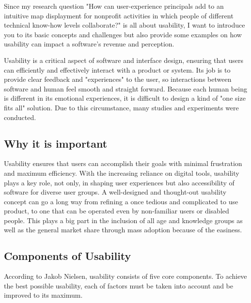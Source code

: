 \Author{\daAuthorTwo}

Since my research question "How can user-experience principals add to an intuitive map displayment for nonprofit activities in which people of different technical know-how levels collaborate?" is all about usability, I want to introduce you to its basic concepts and challenges but also provide some examples on how usability can impact a software's revenue and perception.

\blankLine

Usability is a critical aspect of software and interface design, ensuring that users can efficiently and effectively interact with a product or system. Its job is to provide clear feedback and "experiences" to the user, so interactions between software and human feel smooth and straight forward. Because each human being is different in its emotional experiences, it is difficult to design a kind of "one size fits all" solution. Due to this circumstance, many studies and experiments were conducted.
\autocite{Paul:Usability101}

\subsection{Why it is important}

Usability ensures that users can accomplish their goals with minimal frustration and maximum efficiency. With the increasing reliance on digital tools, usability plays a key role, not only, in shaping user experiences but also accessibility of software for diverse user groups. A well-designed and thought-out usability concept can go a long way from refining a once tedious and complicated to use product, to one that can be operated even by non-familiar users or disabled people. This plays a big part in the inclusion of all age and knowledge groups as well as the general market share through mass adoption because of the easiness.

\subsection{Components of Usability}

According to Jakob Nielsen, usability consists of five core components. To achieve the best possible usability, each of factors must be taken into account and be improved to its maximum.

